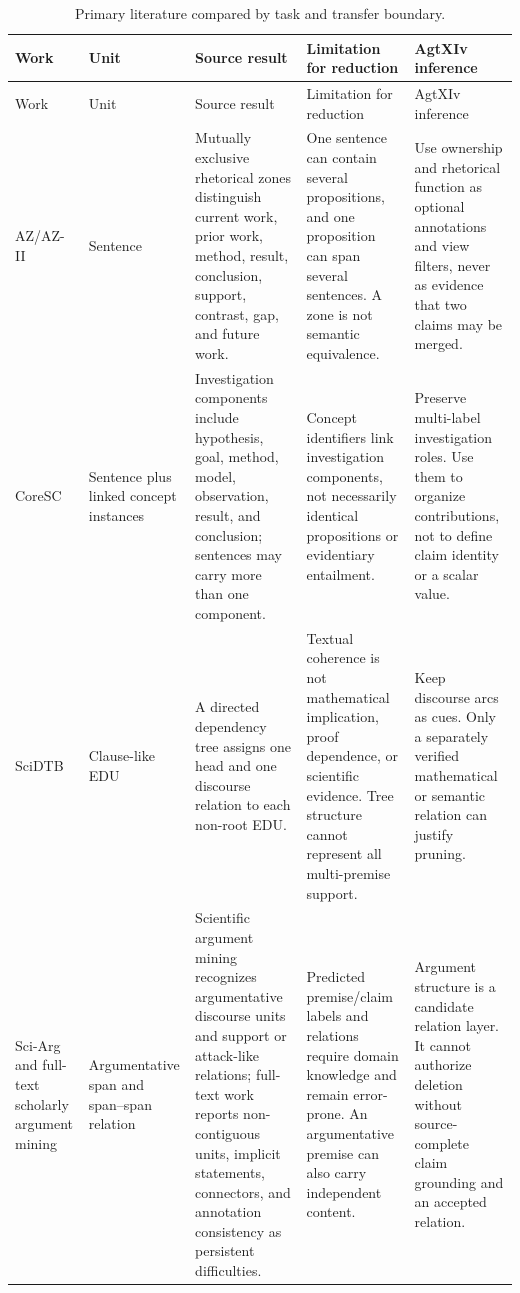 \small
\setlength{\tabcolsep}{3pt}
\begin{longtable}{>{\raggedright\arraybackslash}p{}>{\raggedright\arraybackslash}p{}>{\raggedright\arraybackslash}p{}>{\raggedright\arraybackslash}p{}>{\raggedright\arraybackslash}p{}}
\caption{Primary literature compared by task and transfer boundary.}\label{tab:literature-evidence}\\
\toprule
Work & Unit & Source result & Limitation for reduction & AgtXIv inference \\
\midrule
\endfirsthead
\toprule
Work & Unit & Source result & Limitation for reduction & AgtXIv inference \\
\midrule
\endhead
AZ/AZ-II~\cite{teufel1999az,teufel2009azii} & Sentence & Mutually exclusive rhetorical zones distinguish current work, prior work, method, result, conclusion, support, contrast, gap, and future work. & One sentence can contain several propositions, and one proposition can span several sentences. A zone is not semantic equivalence. & Use ownership and rhetorical function as optional annotations and view filters, never as evidence that two claims may be merged. \\
CoreSC~\cite{liakata2010coresc,liakata2012coresc} & Sentence plus linked concept instances & Investigation components include hypothesis, goal, method, model, observation, result, and conclusion; sentences may carry more than one component. & Concept identifiers link investigation components, not necessarily identical propositions or evidentiary entailment. & Preserve multi-label investigation roles. Use them to organize contributions, not to define claim identity or a scalar value. \\
SciDTB~\cite{yang2018scidtb} & Clause-like EDU & A directed dependency tree assigns one head and one discourse relation to each non-root EDU. & Textual coherence is not mathematical implication, proof dependence, or scientific evidence. Tree structure cannot represent all multi-premise support. & Keep discourse arcs as cues. Only a separately verified mathematical or semantic relation can justify pruning. \\
Sci-Arg and full-text scholarly argument mining~\cite{lauscher2018sciarg,binder2022fulltext} & Argumentative span and span--span relation & Scientific argument mining recognizes argumentative discourse units and support or attack-like relations; full-text work reports non-contiguous units, implicit statements, connectors, and annotation consistency as persistent difficulties. & Predicted premise/claim labels and relations require domain knowledge and remain error-prone. An argumentative premise can also carry independent content. & Argument structure is a candidate relation layer. It cannot authorize deletion without source-complete claim grounding and an accepted relation. \\

\end{longtable}
